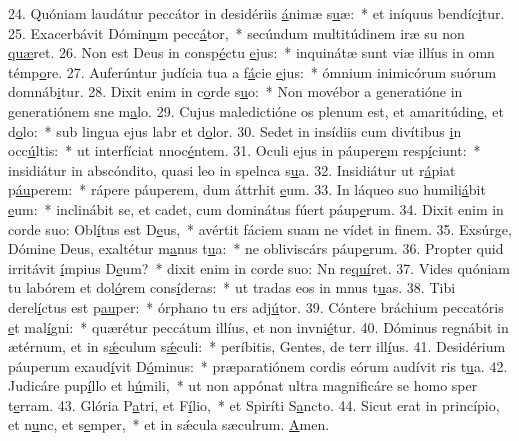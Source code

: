 24. Quóniam laudátur peccátor in desidériis \uline{á}nimæ s\uline{u}æ:~* et iníquus bendíc\uline{i}tur.
25. Exacerbávit Dómin\uline{u}m pecc\uline{á}tor,~* secúndum multitúdinem iræ su non \uline{quæ}ret.
26. Non est Deus in consp\uline{é}ctu \uline{e}jus:~* inquinátæ sunt viæ illíus in omn témp\uline{o}re.
27. Auferúntur judícia tua a f\uline{á}cie \uline{e}jus:~* ómnium inimicórum suórum domnáb\uline{i}tur.
28. Dixit enim in c\uline{o}rde s\uline{u}o:~* Non movébor a generatióne in generatiónem sne m\uline{a}lo.
29. Cujus maledictióne os plenum est, et amaritúdin\uline{e}, et d\uline{o}lo:~* sub lingua ejus labr et d\uline{o}lor.
30. Sedet in insídiis cum divítibus \uline{i}n occ\uline{ú}ltis:~* ut interfíciat nnoc\uline{é}ntem.
31. Oculi ejus in páuper\uline{e}m resp\uline{í}ciunt:~* insidiátur in abscóndito, quasi leo in spelnca s\uline{u}a.
32. Insidiátur ut r\uline{á}piat p\uline{áu}perem:~* rápere páuperem, dum áttrhit \uline{e}um.
33. In láqueo suo humili\uline{á}bit \uline{e}um:~* inclinábit se, et cadet, cum dominátus fúert páup\uline{e}rum.
34. Dixit enim in corde suo: Obl\uline{í}tus est D\uline{e}us,~* avértit fáciem suam ne vídet in f\uline{i}nem.
35. Exsúrge, Dómine Deus, exaltétur m\uline{a}nus t\uline{u}a:~* ne obliviscárs páup\uline{e}rum.
36. Propter quid irritávit \uline{í}mpius D\uline{e}um?~* dixit enim in corde suo: Nn re\uline{quí}ret.
37. Vides quóniam tu labórem et dol\uline{ó}rem cons\uline{í}deras:~* ut tradas eos in mnus t\uline{u}as.
38. Tibi derel\uline{í}ctus est p\uline{au}per:~* órphano tu ers adj\uline{ú}tor.
39. Cóntere bráchium peccatóris \uline{e}t mal\uline{í}gni:~* quærétur peccátum illíus, et non invni\uline{é}tur.
40. Dóminus regnábit in ætérnum, et in s\uline{ǽ}culum s\uline{ǽ}culi:~* períbitis, Gentes, de terr ill\uline{í}us.
41. Desidérium páuperum exaud\uline{í}vit D\uline{ó}minus:~* præparatiónem cordis eórum audívit ris t\uline{u}a.
42. Judicáre pup\uline{í}llo et h\uline{ú}mili,~* ut non appónat ultra magnificáre se homo sper t\uline{e}rram.
43. Glória P\uline{a}tri, et F\uline{í}lio,~* et Spiríti S\uline{a}ncto.
44. Sicut erat in princípio, et n\uline{u}nc, et s\uline{e}mper,~* et in sǽcula sæculrum. \uline{A}men.
